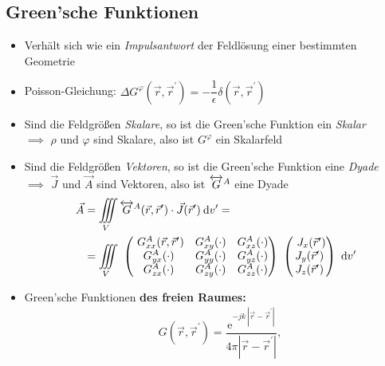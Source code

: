 {\subsection{Green'sche Funktionen}
\begin{itemize}
    \itemsep1pt
    \item Verhält sich wie ein \textit{Impulsantwort} der Feldlösung einer bestimmten Geometrie
    \item Poisson-Gleichung: \(\Delta G^\varphi(\vec{r}, \vec{r}^\prime) = -\dfrac{1}{\epsilon}\delta(\vec{r}, \vec{r}^\prime)\)
    \item Sind die Feldgrößen \textit{Skalare}, so ist die Green'sche Funktion ein \textit{Skalar}\\
        $\implies$ $\rho$ und $\varphi$ sind Skalare, also ist $G^\varphi$ ein Skalarfeld
    \item Sind die Feldgrößen \textit{Vektoren}, so ist die Green'sche Funktion eine \textit{Dyade}\\
        $\implies$ $\vec{J}$ und $\vec{A}$ sind Vektoren, also ist $\overleftrightarrow{G}^A$ eine Dyade
        \begin{align*}
            \vec{A} &= \iiint\limits_V \overleftrightarrow{G}^A(\vec{r},\vec{r}^\prime) \cdot \vec{J}(\vec{r}^\prime)\:\mathrm{d}v^\prime =\\
            &= \iiint\limits_V\
            \begin{pmatrix}\
                G^A_{xx}(\vec{r},\vec{r}^\prime) & G^A_{xy}(\cdot) & G^A_{xz}(\cdot)\\
                G^A_{yx}(\cdot) & G^A_{yy}(\cdot) & G^A_{yz}(\cdot)\\
                G^A_{zx}(\cdot) & G^A_{zy}(\cdot) & G^A_{zz}(\cdot)
            \end{pmatrix}\
            \begin{pmatrix}\
                J_x(\vec{r}^\prime)\\
                J_y(\vec{r}^\prime)\\
                J_z(\vec{r}^\prime)
            \end{pmatrix}\
            \mathrm{d}v^\prime
        \end{align*}
    \item Green'sche Funktionen \textbf{des freien Raumes:}\\
        \begin{align*}
            &G(\vec{r},\vec{r}^\prime) = \dfrac{\mathrm{e}^{-jk\:|\vec{r} - \vec{r}^\prime|}}{4\pi|\vec{r} - \vec{r}^\prime|},\\

\end{align*}
\end{itemize}}
